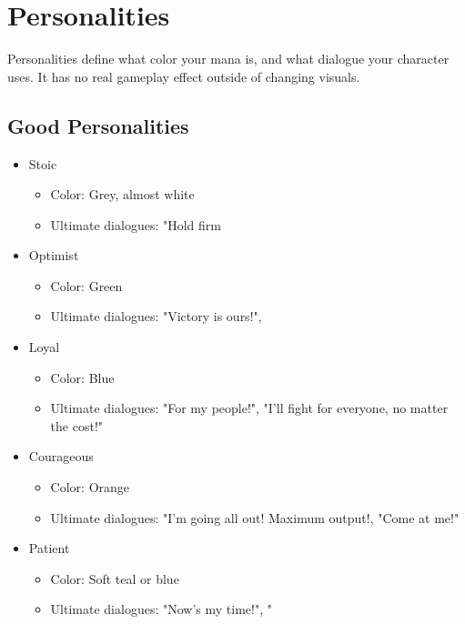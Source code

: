 \documentclass{report}
\begin{document}
    
        \section{Personalities}
        Personalities define what color your mana is, and what dialogue your character uses. It has no real gameplay effect outside of changing visuals.

        \subsection{Good Personalities}
        \begin{itemize}
            \item Stoic \begin{itemize}
                \item Color: Grey, almost white
                \item Ultimate dialogues: "Hold firm
            \end{itemize}

            \item Optimist \begin{itemize}
                \item Color: Green
                \item Ultimate dialogues: "Victory is ours!",
            \end{itemize}

            \item Loyal \begin{itemize}
                \item Color: Blue
                \item Ultimate dialogues: "For my people!", "I'll fight for everyone, no matter the cost!"
            \end{itemize}

            \item Courageous \begin{itemize}
                \item Color: Orange
                \item Ultimate dialogues: "I'm going all out! Maximum output!, "Come at me!"
            \end{itemize}            

            \item Patient \begin{itemize}
                \item Color: Soft teal or blue
                \item Ultimate dialogues: "Now's my time!", "
            \end{itemize}      


\end{itemize}
\end{document}
